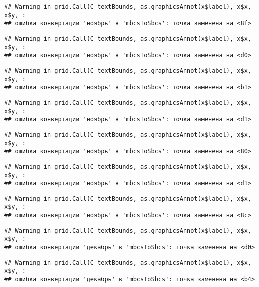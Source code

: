 \documentclass[
]{article}
\begin{document}
\begin{verbatim}
## Warning in grid.Call(C_textBounds, as.graphicsAnnot(x$label), x$x, x$y, :
## ошибка конвертации 'ноябрь' в 'mbcsToSbcs': точка заменена на <8f>
\end{verbatim}

\begin{verbatim}
## Warning in grid.Call(C_textBounds, as.graphicsAnnot(x$label), x$x, x$y, :
## ошибка конвертации 'ноябрь' в 'mbcsToSbcs': точка заменена на <d0>
\end{verbatim}

\begin{verbatim}
## Warning in grid.Call(C_textBounds, as.graphicsAnnot(x$label), x$x, x$y, :
## ошибка конвертации 'ноябрь' в 'mbcsToSbcs': точка заменена на <b1>
\end{verbatim}

\begin{verbatim}
## Warning in grid.Call(C_textBounds, as.graphicsAnnot(x$label), x$x, x$y, :
## ошибка конвертации 'ноябрь' в 'mbcsToSbcs': точка заменена на <d1>
\end{verbatim}

\begin{verbatim}
## Warning in grid.Call(C_textBounds, as.graphicsAnnot(x$label), x$x, x$y, :
## ошибка конвертации 'ноябрь' в 'mbcsToSbcs': точка заменена на <80>
\end{verbatim}

\begin{verbatim}
## Warning in grid.Call(C_textBounds, as.graphicsAnnot(x$label), x$x, x$y, :
## ошибка конвертации 'ноябрь' в 'mbcsToSbcs': точка заменена на <d1>
\end{verbatim}

\begin{verbatim}
## Warning in grid.Call(C_textBounds, as.graphicsAnnot(x$label), x$x, x$y, :
## ошибка конвертации 'ноябрь' в 'mbcsToSbcs': точка заменена на <8c>
\end{verbatim}

\begin{verbatim}
## Warning in grid.Call(C_textBounds, as.graphicsAnnot(x$label), x$x, x$y, :
## ошибка конвертации 'декабрь' в 'mbcsToSbcs': точка заменена на <d0>
\end{verbatim}

\begin{verbatim}
## Warning in grid.Call(C_textBounds, as.graphicsAnnot(x$label), x$x, x$y, :
## ошибка конвертации 'декабрь' в 'mbcsToSbcs': точка заменена на <b4>
\end{verbatim}
\end{document}
